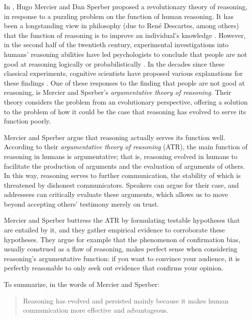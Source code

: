 
In \citeyear{MS11}, Hugo Mercier and Dan Sperber proposed a revolutionary
theory of reasoning, in response to a puzzling problem on the function of human reasoning.
It has been a longstanding view in philosophy (due to René Descartes, among others) that the function of reasoning is to improve an individual's knowledge \citep{Schouls72, Walter51}.
However, in the second half of the twentieth century, experimental investigations into humans' reasoning abilities have led psychologists to conclude that people are not good at reasoning logically \citep{Wason68} or probabilistically \citep{Tversky83}.
In the decades since these classical experiments, cognitive scientists have proposed various explanations for these findings \citep[e.g.]{Cosmides89, Oaksford94, Hertwig99}.
One of these responses to the finding that people are not good at reasoning, is Mercier and Sperber's \emph{argumentative theory of reasoning}.
Their theory considers the problem from an evolutionary perspective, offering a solution to the problem of how it could be the case that reasoning has evolved to serve its function poorly.

Mercier and Sperber argue that reasoning actually serves its function well.
According to their \emph{argumentative theory of reasoning} (ATR), the main function of reasoning in humans is argumentative; that is, reasoning evolved in humans to facilitate the production of arguments and the evaluation of arguments of others. In this way, reasoning serves to further communication, the stability of which is threatened by dishonest communicators. Speakers can argue for their case, and addressees can critically evaluate these arguments, which allows us to move beyond accepting others' testimony merely on trust.

Mercier and Sperber buttress the ATR by formulating testable hypotheses that are entailed by it, and they gather empirical evidence to corroborate these hypotheses. They argue for example that the phenomenon of confirmation bias, usually construed as a flaw of reasoning, makes perfect sense when considering reasoning's argumentative function: if you want to convince your audience, it is perfectly reasonable to only seek out evidence that confirms your opinion.

To summarize, in the words of Mercier and Sperber:
\begin{quote}
    Reasoning has evolved and persisted mainly because it makes human communication more effective and advantageous.
    \citep[p.~60]{MS11}
\end{quote}

